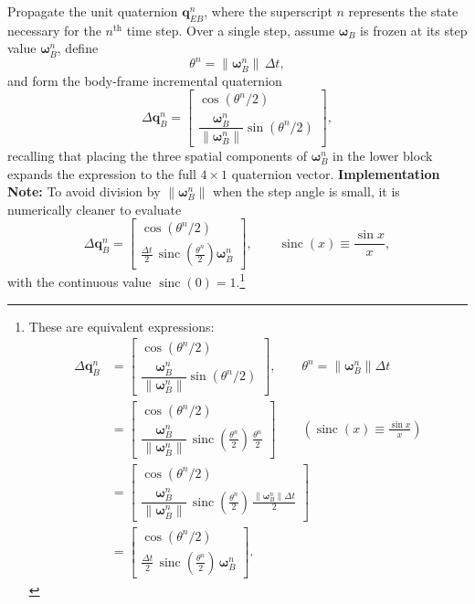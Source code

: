 Propagate the unit quaternion \(\mathbf q_{EB}^n\), where the superscript \(n\) represents the state necessary for the \(n^\textrm{th}\) time step. Over a single step, assume \(\boldsymbol\omega_B\) is frozen at its step value \(\boldsymbol\omega_B^n\), define
\begin{equation}
\theta^n = \|\boldsymbol\omega_B^n\|\,\Delta t,
\end{equation}
and form the body-frame incremental quaternion
\begin{equation}
\Delta\mathbf q_B^n
=
\begin{bmatrix}
\cos(\theta^n/2)\\[2pt]
\dfrac{\boldsymbol\omega_B^n}{\|\boldsymbol\omega_B^n\|}\sin(\theta^n/2)
\end{bmatrix}, \label{eq:delta_quat}
\end{equation}
recalling that placing the three spatial components of \(\boldsymbol{\omega}_B^n\) in the lower block expands the expression to the full \(4\times1\) quaternion vector. \textbf{Implementation Note:} To avoid division by \(\|\boldsymbol\omega_B^n\|\) when the step angle is small, it is numerically cleaner to evaluate
\begin{equation}
\Delta\mathbf q_B^n
=
\begin{bmatrix}
\cos(\theta^n/2)\\[2pt]
\frac{\Delta t}{2}\,\operatorname{sinc}\!\left(\frac{\theta^n}{2}\right)\boldsymbol\omega_B^n
\end{bmatrix},
\qquad
\operatorname{sinc}(x)\equiv\frac{\sin x}{x},
\end{equation}
with the continuous value \(\operatorname{sinc}(0)=1\).\footnote{These are equivalent expressions:
\begin{align*}
\Delta\mathbf q_B^n
&=
\begin{bmatrix}
\cos(\theta^n/2)\\[2pt]
\dfrac{\boldsymbol\omega_B^n}{\|\boldsymbol\omega_B^n\|}\sin(\theta^n/2)
\end{bmatrix},
\qquad
\theta^n = \|\boldsymbol\omega_B^n\|\Delta t
\\[6pt]
&=
\begin{bmatrix}
\cos(\theta^n/2)\\[2pt]
\dfrac{\boldsymbol\omega_B^n}{\|\boldsymbol\omega_B^n\|}\,
\operatorname{sinc}\!\left(\frac{\theta^n}{2}\right)\,
\frac{\theta^n}{2}
\end{bmatrix}
\qquad
\left(
\operatorname{sinc}(x)\equiv \frac{\sin x}{x}
\right)
\\[6pt]
&=
\begin{bmatrix}
\cos(\theta^n/2)\\[2pt]
\dfrac{\boldsymbol\omega_B^n}{\|\boldsymbol\omega_B^n\|}\,
\operatorname{sinc}\!\left(\frac{\theta^n}{2}\right)\,
\frac{\|\boldsymbol\omega_B^n\|\Delta t}{2}
\end{bmatrix}
\\[6pt]
&=
\begin{bmatrix}
\cos(\theta^n/2)\\[2pt]
\frac{\Delta t}{2}\,
\operatorname{sinc}\!\left(\frac{\theta^n}{2}\right)\,
\boldsymbol\omega_B^n
\end{bmatrix}.
\end{align*}
}


